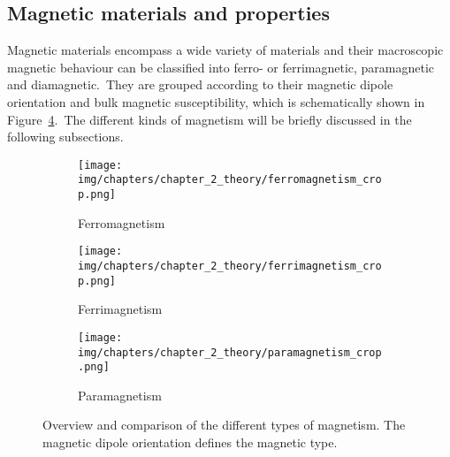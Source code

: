 \subsection{Magnetic materials and properties}\label{subsec:magneticMaterialsAndProperties}
Magnetic materials encompass a wide variety of materials and their macroscopic magnetic behaviour can be classified into ferro- or ferrimagnetic, paramagnetic and diamagnetic.\ They are grouped according to their magnetic dipole orientation and bulk magnetic susceptibility, which is schematically shown in Figure~\ref{fig:magneticMaterialProperty}.\ The different kinds of magnetism will be briefly discussed in the following subsections.\
\begin{figure}[htb]
        \centering
        \begin{subfigure}[b]{0.29\textwidth}
        \centering
                \texttt{[image: img/chapters/chapter\_2\_theory/ferromagnetism\_crop.png]}
                \caption{Ferromagnetism}
                \label{fig:ferromagnetism}
        \end{subfigure}
        \hfill
        \begin{subfigure}[b]{0.29\textwidth}
        \centering
                \texttt{[image: img/chapters/chapter\_2\_theory/ferrimagnetism\_crop.png]}
                \caption{Ferrimagnetism}
                \label{fig:ferrimagnetism}
        \end{subfigure}
        \hfill
        \begin{subfigure}[b]{0.29\textwidth}
        \centering
		        \texttt{[image: img/chapters/chapter\_2\_theory/paramagnetism\_crop.png]}			
                \caption{Paramagnetism}
                \label{fig:paramagnetism}
        \end{subfigure}
        \caption[Overview and comparison of the different types of magnetism]{Overview and comparison of the different types of magnetism. The magnetic dipole orientation defines the magnetic type.}
        \label{fig:magneticMaterialProperty}
\end{figure}
%
